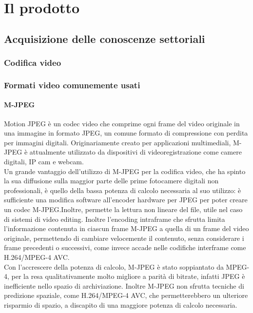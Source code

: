 \chapter{Il prodotto\label{cap:ilprodotto}}
\section{Acquisizione delle conoscenze settoriali}
	\subsection{Codifica video}

	\subsection{Formati video comunemente usati}
		\subsubsection{M-JPEG}
			Motion JPEG	è un codec video che comprime ogni frame del video originale in una immagine in formato JPEG, un comune formato di compressione con perdita per immagini digitali. Originariamente creato per applicazioni multimediali, M-JPEG è attualmente utilizzato da dispositivi di videoregistrazione come camere digitali, IP cam e webcam.
			\\
			Un grande vantaggio dell'utilizzo di M-JPEG per la codifica video, che ha spinto la sua diffusione sulla maggior parte delle prime fotocamere digitali non professionali, è quello della bassa potenza di calcolo necessaria al suo utilizzo: è sufficiente una modifica software all'encoder hardware per JPEG per poter creare un codec M-JPEG.\@ Inoltre, permette la lettura non lineare del file, utile nel caso di sistemi di video editing. Inoltre l'encoding intraframe che sfrutta limita l'informazione contenuta in ciascun frame M-JPEG a quella di un frame del video originale, permettendo di cambiare velocemente il contenuto, senza considerare i frame precedenti o successivi, come invece accade nelle codifiche interframe come H.264/MPEG-4 AVC.\@
			\\
			Con l'accrescere della potenza di calcolo, M-JPEG	è stato soppiantato da MPEG-4, per la resa qualitativamente molto migliore a parità di bitrate, infatti JPEG è inefficiente nello spazio di archiviazione. Inoltre M-JPEG non sfrutta tecniche di predizione spaziale, come H.264/MPEG-4 AVC, che permetterebbero un ulteriore risparmio di spazio, a discapito di una maggiore potenza di calcolo necessaria.

